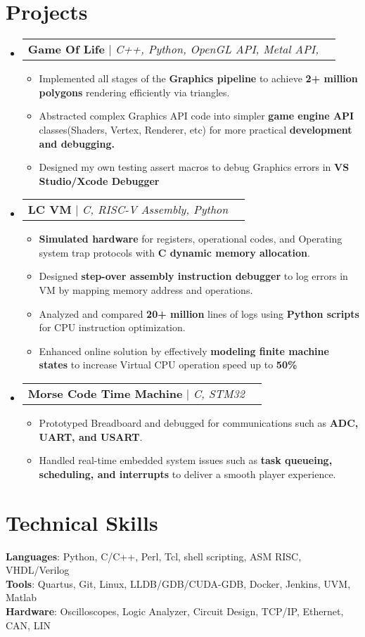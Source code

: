 \documentclass[letterpaper,11pt]{article}
\makeatletter
\newcommand{\resumeItem}[1]{
  \item\small{
    {#1 \vspace{-2pt}}
  }
}
\newcommand{\resumeProjectHeading}[2]{
    \item
    \begin{tabular*}{0.97\textwidth}{l@{\extracolsep{\fill}}r}
      \small#1 & #2 \\
    \end{tabular*}\vspace{-7pt}
}
\newcommand{\resumeSubHeadingListStart}{\begin{itemize}[leftmargin=0.15in, label={}]}
\newcommand{\resumeSubHeadingListEnd}{\end{itemize}}
\newcommand{\resumeItemListStart}{\begin{itemize}}
\newcommand{\resumeItemListEnd}{\end{itemize}\vspace{-5pt}}
\makeatother
\begin{document}
\section{Projects}
    \resumeSubHeadingListStart
      \resumeProjectHeading
      {\textbf{Game Of Life} $|$ \emph{C++, Python, OpenGL API, Metal API, }}{}
          \resumeItemListStart
            \resumeItem {Implemented all stages of the \textbf{Graphics pipeline} to achieve \textbf{2+ million polygons} rendering efficiently via triangles.}
            \resumeItem {Abstracted complex Graphics API code into simpler \textbf{game engine API} classes(Shaders, Vertex, Renderer, etc) for more practical \textbf{development and debugging.}}
            \resumeItem {Designed my own testing assert macros to debug Graphics errors in \textbf{VS Studio/Xcode Debugger}}
          \resumeItemListEnd
      \resumeProjectHeading
      {\textbf{LC VM} $|$ \emph{C, RISC-V Assembly, Python}}{}
      \resumeItemListStart
          \resumeItem {\textbf{Simulated hardware} for registers, operational codes, and Operating system trap protocols with \textbf{C dynamic memory allocation}.}
          \resumeItem  { Designed \textbf{step-over assembly instruction debugger} to log errors in VM by mapping memory address and operations.}
          \resumeItem {Analyzed and compared \textbf{20+ million} lines of logs using \textbf{Python scripts} for CPU instruction optimization.}
          \resumeItem {Enhanced online solution by effectively \textbf{modeling finite machine states} to increase Virtual CPU operation speed up to \textbf{50\%}}
      \resumeItemListEnd
      \resumeProjectHeading
        {\textbf{Morse Code Time Machine} $|$ \emph{C, STM32}}{} 
        \resumeItemListStart
          \resumeItem {Prototyped Breadboard and debugged for communications such as \textbf{ADC, UART, and USART}.}
          \resumeItem {Handled real-time embedded system issues such as \textbf{task queueing, scheduling, and interrupts} to deliver a smooth player experience.}
        \resumeItemListEnd
    \resumeSubHeadingListEnd
%
\section{Technical Skills}
 \begin{itemize}[leftmargin=0.15in, label={}]
    \small{\item{
     \textbf{Languages}{: Python, C/C++, Perl, Tcl, shell scripting, ASM RISC, VHDL/Verilog} \\
     \textbf{Tools}{: Quartus, Git, Linux, LLDB/GDB/CUDA-GDB, Docker, Jenkins, UVM, Matlab } \\
     \textbf{Hardware}{: Oscilloscopes, Logic Analyzer, Circuit Design, TCP/IP, Ethernet, CAN, LIN } \\
    }}
 \end{itemize}


\end{document}
